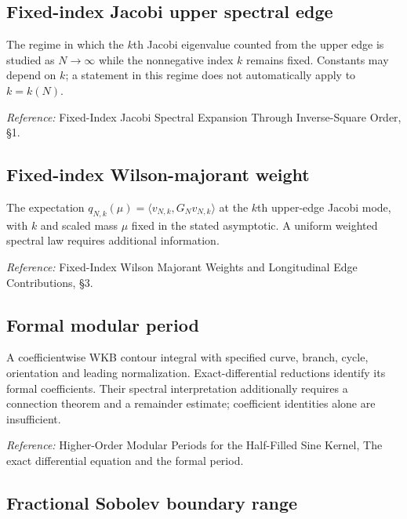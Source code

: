 \documentclass[
  10pt,
  a4paper,
]{article}
\begin{document}
\subsection{Fixed-index Jacobi upper spectral edge}\label{fixed-index-jacobi-upper-spectral-edge}

The regime in which the \(k\)th Jacobi eigenvalue counted from the upper edge is studied as \(N\to\infty\) while the nonnegative index \(k\) remains fixed. Constants may depend on \(k\); a statement in this regime does not automatically apply to \(k=k(N)\).

\nopagebreak[4]

\emph{Reference:} Fixed-Index Jacobi Spectral Expansion Through Inverse-Square Order, §1.

\subsection{Fixed-index Wilson-majorant weight}\label{fixed-index-wilson-majorant-weight}

The expectation \(q_{N,k}(\mu)=\langle v_{N,k},G_Nv_{N,k}\rangle\) at the \(k\)th upper-edge Jacobi mode, with \(k\) and scaled mass \(\mu\) fixed in the stated asymptotic. A uniform weighted spectral law requires additional information.

\nopagebreak[4]

\emph{Reference:} Fixed-Index Wilson Majorant Weights and Longitudinal Edge Contributions, §3.

\subsection{Formal modular period}\label{formal-modular-period}

A coefficientwise WKB contour integral with specified curve, branch, cycle, orientation and leading normalization. Exact-differential reductions identify its formal coefficients. Their spectral interpretation additionally requires a connection theorem and a remainder estimate; coefficient identities alone are insufficient.

\nopagebreak[4]

\emph{Reference:} Higher-Order Modular Periods for the Half-Filled Sine Kernel, The exact differential equation and the formal period.

\subsection{Fractional Sobolev boundary range}\label{fractional-sobolev-boundary-range}
\end{document}

